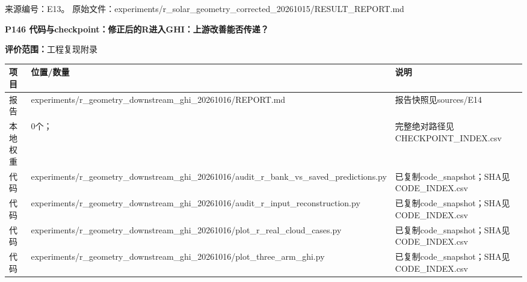 \documentclass[UTF8,a4paper,landscape,10pt]{ctexart}
\begin{document}
\vfill{\scriptsize\color{muted} 来源编号：E13。 原始文件：experiments/\allowbreak{}r\_\allowbreak{}solar\_\allowbreak{}geometry\_\allowbreak{}corrected\_\allowbreak{}20261015/\allowbreak{}RESULT\_\allowbreak{}REPORT.md}\par
\clearpage
{\large\bfseries\color{ink} P146  代码与checkpoint：修正后的R进入GHI：上游改善能否传递？}\par
{}\par
{\small\color{muted}\textbf{评价范围：}工程复现附录}\par\vspace{3mm}
\begin{center}\small
\begin{adjustbox}{max totalheight=0.58\textheight,max width=\linewidth}
\begin{minipage}{\linewidth}\begin{tabularx}{\linewidth}{>{\hsize=0.3500\hsize\raggedright\arraybackslash}X>{\hsize=1.9000\hsize\raggedright\arraybackslash}X>{\hsize=0.7500\hsize\raggedright\arraybackslash}X}\toprule
\textbf{项目} & \textbf{位置/\allowbreak{}数量} & \textbf{说明} \\ \midrule
报告 & experiments/\allowbreak{}r\_\allowbreak{}geometry\_\allowbreak{}downstream\_\allowbreak{}ghi\_\allowbreak{}20261016/\allowbreak{}REPORT.md & 报告快照见sources/\allowbreak{}E14 \\
本地权重 & 0个； & 完整绝对路径见CHECKPOINT\_\allowbreak{}INDEX.csv \\
代码 & experiments/\allowbreak{}r\_\allowbreak{}geometry\_\allowbreak{}downstream\_\allowbreak{}ghi\_\allowbreak{}20261016/\allowbreak{}audit\_\allowbreak{}r\_\allowbreak{}bank\_\allowbreak{}vs\_\allowbreak{}saved\_\allowbreak{}predictions.py & 已复制code\_\allowbreak{}snapshot；SHA见CODE\_\allowbreak{}INDEX.csv \\
代码 & experiments/\allowbreak{}r\_\allowbreak{}geometry\_\allowbreak{}downstream\_\allowbreak{}ghi\_\allowbreak{}20261016/\allowbreak{}audit\_\allowbreak{}r\_\allowbreak{}input\_\allowbreak{}reconstruction.py & 已复制code\_\allowbreak{}snapshot；SHA见CODE\_\allowbreak{}INDEX.csv \\
代码 & experiments/\allowbreak{}r\_\allowbreak{}geometry\_\allowbreak{}downstream\_\allowbreak{}ghi\_\allowbreak{}20261016/\allowbreak{}plot\_\allowbreak{}r\_\allowbreak{}real\_\allowbreak{}cloud\_\allowbreak{}cases.py & 已复制code\_\allowbreak{}snapshot；SHA见CODE\_\allowbreak{}INDEX.csv \\
代码 & experiments/\allowbreak{}r\_\allowbreak{}geometry\_\allowbreak{}downstream\_\allowbreak{}ghi\_\allowbreak{}20261016/\allowbreak{}plot\_\allowbreak{}three\_\allowbreak{}arm\_\allowbreak{}ghi.py & 已复制code\_\allowbreak{}snapshot；SHA见CODE\_\allowbreak{}INDEX.csv \\
\bottomrule\end{tabularx}\end{minipage}\end{adjustbox}\end{center}
\end{document}
